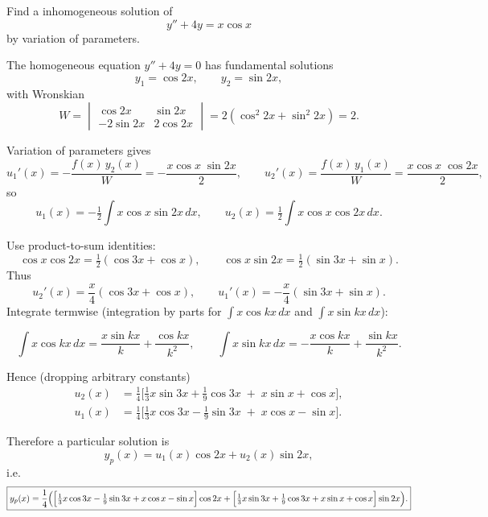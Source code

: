 \documentclass[a4paper,11pt,reqno]{amsart}
\numberwithin{equation}{section}
\begin{document}
\begin{enumerate}
\begin{center}
{{      Find a inhomogeneous solution of
      \[
      y'' + 4y = x\cos x
      \]
      by variation of parameters.

      The homogeneous equation \(y''+4y=0\) has fundamental solutions
      \[
      y_1=\cos 2x,\qquad y_2=\sin 2x,
      \]
      with Wronskian
      \[
      W=\begin{vmatrix}\cos2x & \sin2x\\ -2\sin2x & 2\cos2x\end{vmatrix}
      =2(\cos^2 2x+\sin^2 2x)=2.
      \]

      Variation of parameters gives
      \[
      u_1'(x) = -\frac{f(x)\,y_2(x)}{W} = -\frac{x\cos x\;\sin2x}{2},\qquad
      u_2'(x) = \frac{f(x)\,y_1(x)}{W} = \frac{x\cos x\;\cos2x}{2},
      \]
      so
      \[
      u_1(x) = -\tfrac{1}{2}\int x\cos x\sin2x\,dx,\qquad
      u_2(x)=\tfrac{1}{2}\int x\cos x\cos2x\,dx.
      \]

      Use product-to-sum identities:
      \[
      \cos x\cos2x=\tfrac12(\cos3x+\cos x),\qquad
      \cos x\sin2x=\tfrac12(\sin3x+\sin x).
      \]
      Thus
      \[
      u_2'(x)=\frac{x}{4}(\cos3x+\cos x),\qquad
      u_1'(x)=-\frac{x}{4}(\sin3x+\sin x).
      \]
      Integrate termwise (integration by parts for \(\int x\cos kx\,dx\) and \(\int x\sin kx\,dx\)):

      \[
      \int x\cos kx\,dx=\frac{x\sin kx}{k}+\frac{\cos kx}{k^2},\qquad
      \int x\sin kx\,dx=-\frac{x\cos kx}{k}+\frac{\sin kx}{k^2}.
      \]

      Hence (dropping arbitrary constants)
      \[
      \begin{aligned}
      u_2(x) &= \tfrac{1}{4}\Big[\tfrac{1}{3}x\sin 3x + \tfrac{1}{9}\cos 3x \;+\; x\sin x + \cos x\Big],\\[4pt]
      u_1(x) &= \tfrac{1}{4}\Big[\tfrac{1}{3}x\cos 3x - \tfrac{1}{9}\sin 3x \;+\; x\cos x - \sin x\Big].
      \end{aligned}
      \]

      Therefore a particular solution is
      \[
      y_p(x)=u_1(x)\cos2x + u_2(x)\sin2x,
      \]
      i.e.
      \[
      \boxed{%
      y_p(x)=\frac{1}{4}\Big(\Big[\tfrac{1}{3}x\cos3x-\tfrac{1}{9}\sin3x+x\cos x-\sin x\Big]\cos2x
      +\Big[\tfrac{1}{3}x\sin3x+\tfrac{1}{9}\cos3x+x\sin x+\cos x\Big]\sin2x\Big).}
      \]
      }}
    \end{center}
\end{enumerate}
\end{document}
